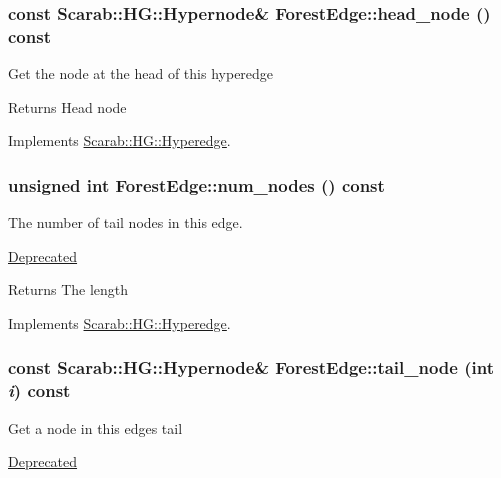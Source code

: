 \hypertarget{classForestEdge_a75fd8cd6604187f2e046a3bc0b0da349}{
\subsubsection[{head\_\-node}]{\setlength{\rightskip}{0pt plus 5cm}const {\bf Scarab::HG::Hypernode}\& ForestEdge::head\_\-node () const}}
\label{classForestEdge_a75fd8cd6604187f2e046a3bc0b0da349}
Get the node at the head of this hyperedge

\begin{DoxyReturn}{Returns}
Head node 
\end{DoxyReturn}


Implements \hyperlink{classScarab_1_1HG_1_1Hyperedge_a6043de341070c103d811f5286193dd46}{Scarab::HG::Hyperedge}.

\hypertarget{classForestEdge_a46d00caee9d1984712cae52f4a45be7a}{
\subsubsection[{num\_\-nodes}]{\setlength{\rightskip}{0pt plus 5cm}unsigned int ForestEdge::num\_\-nodes () const}}
\label{classForestEdge_a46d00caee9d1984712cae52f4a45be7a}
The number of tail nodes in this edge. \begin{Desc}
\item[\hyperlink{deprecated__deprecated000002}{Deprecated}]\end{Desc}
\begin{DoxyReturn}{Returns}
The length 
\end{DoxyReturn}


Implements \hyperlink{classScarab_1_1HG_1_1Hyperedge_a799d8d98242c129d7eee178bdf1fb535}{Scarab::HG::Hyperedge}.

\hypertarget{classForestEdge_a20069b896bec6c5a83c24480c9057f4f}{
\subsubsection[{tail\_\-node}]{\setlength{\rightskip}{0pt plus 5cm}const {\bf Scarab::HG::Hypernode}\& ForestEdge::tail\_\-node (int {\em i}) const}}
\label{classForestEdge_a20069b896bec6c5a83c24480c9057f4f}
Get a node in this edges tail \begin{Desc}
\item[\hyperlink{deprecated__deprecated000001}{Deprecated}]\end{Desc}

